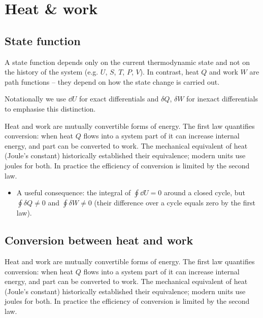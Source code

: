 \section{Heat \& work}

	\subsection{State function}
		A state function depends only on the current thermodynamic state and not on the history of the system (e.g. $U$, $S$, $T$, $P$, $V$). In contrast, heat $Q$ and work $W$ are path functions -- they depend on how the state change is carried out.
		
		Notationally we use $\dd{U}$ for exact differentials and $\delta{Q}$, $\delta{W}$ for inexact differentials to emphasise this distinction.
		
		Heat and work are mutually convertible forms of energy. The first law quantifies conversion: when heat $Q$ flows into a system part of it can increase internal energy, and part can be converted to work. The mechanical equivalent of heat (Joule's constant) historically established their equivalence; modern units use joules for both. In practice the efficiency of conversion is limited by the second law.
		\begin{itemize}
			\item A useful consequence: the integral of $\oint{\dd{U}}=0$ around a closed cycle, but $\oint{\delta{Q}}\neq 0$ and $\oint{\delta{W}}\neq 0$ (their difference over a cycle equals zero by the first law).
		\end{itemize}
		
	\subsection{Conversion between heat and work}
		Heat and work are mutually convertible forms of energy. The first law quantifies conversion: when heat $Q$ flows into a system part of it can increase internal energy, and part can be converted to work. The mechanical equivalent of heat (Joule's constant) historically established their equivalence; modern units use joules for both. In practice the efficiency of conversion is limited by the second law.
		
